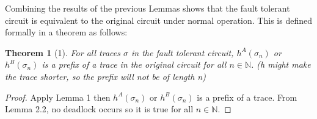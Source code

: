 \documentclass[12pt]{report}
\newtheorem*{theorem}{Theorem}
\begin{document}
Combining the results of the previous Lemmas shows that the fault tolerant circuit is equivalent to the original circuit under normal operation.  This is defined formally in a theorem as follows:
\begin{theorem}[1]
For all traces $\sigma$ in the fault tolerant circuit, $h^{A}(\sigma_n)$ or $h^{B}(\sigma_n)$ is a prefix of a trace in the original circuit for all $n \in \mathbb{N}$.  (h might make the trace shorter, so the prefix will not be of length n) %
\end{theorem}
\begin{proof}
Apply Lemma 1 then $h^{A}(\sigma_n)$ or $h^{B}(\sigma_n)$ is a prefix of a trace.  From Lemma 2.2, no deadlock occurs so it is true for all $n\in \mathbb{N}$.
\end{proof}
\end{document}
